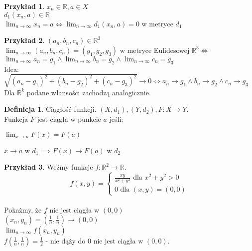 \documentclass{article}
\theoremstyle{definition}
\newtheorem{de}{Definicja}[subsection]
\theoremstyle{definition}
\theoremstyle{definition}
\newtheorem{pk}{Przykład}[subsection]
\theoremstyle{definition}
\begin{document}
\begin{pk}
    $x_n\in\mathbb{R}, a\in X$\\
    $d_1(x_n,a) \in \mathbb{R}$\\
    $\lim_{n\rightarrow \infty} x_n = a \iff \lim_{n\rightarrow\infty} d_1(x_n,a)=0$ w metryce $d_1$
\end{pk}

\begin{pk}
    $(a_n,b_n,c_n) \in \mathbb{R}^3$\\
    $\lim_{n\rightarrow \infty} (a_n,b_n,c_n) = (g_1,g_2,g_3)$ w metryce Eulidesowej $\mathbb{R}^3 \iff$\\
    $\lim_{n\rightarrow \infty} a_n = g_1 \land \lim_{n\rightarrow \infty} b_n = g_2 \land \lim_{n\rightarrow \infty} c_n = g_3$\\
    Idea:\\
    $\sqrt{(a_n-g_1)^2 + (b_n-g_2)^2 + (c_n-g_3)^2}\rightarrow 0 \iff a_n\rightarrow g_1 \land b_n \rightarrow g_2 \land c_n \rightarrow g_3$\\
    Dla $\mathbb{R}^k$ podane włansości zachodzą analogicznie.
\end{pk}

\begin{de}
    Ciągłość funkcji. $(X,d_1), (Y, d_2), F: X\rightarrow Y$. \\
    Funkcja $F$ jest ciągła w punkcie $a$ jeśli:
    \begin{center}
        $\lim_{x\rightarrow a} F(x) = F(a)$
    \end{center}
    $x\rightarrow a$ w $d_1 \implies F(x)\rightarrow F(a)$ w $d_2$
\end{de}

\begin{pk}
    Weźmy funkcje $f: \mathbb{R}^2 \rightarrow \mathbb{R}$.\\
    $$
    f(x,y)=\begin{cases}
        \frac{xy}{x^2+y^2} \text{ dla } x^2+y^2 > 0\\
        0 \text{ dla } (x,y) = (0,0)
    \end{cases}
    $$\\
    Pokażmy, że $f$ nie jest ciągła w $(0,0)$\\
    $(x_n,y_n) = (\frac{1}{n}, \frac{1}{n}) \rightarrow (0,0)$\\
    $\lim_{n\rightarrow \infty} f(x_n, y_n)$\\
    $f(\frac{1}{n}, \frac{1}{n}) = \frac{1}{2}$ - nie dąży do $0$ nie jest ciągła w $(0,0)$. 
\end{pk}
\end{document}
